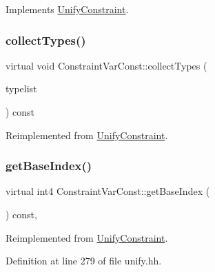 Implements \mbox{\hyperlink{class_unify_constraint_a4f068343932637d355644bb21559aa12}{Unify\+Constraint}}.

\mbox{\label{class_constraint_var_const_afd6f18a2472dfb5dd484b03505a4ebd6}} 
\subsubsection{\texorpdfstring{collectTypes()}{collectTypes()}}
{\footnotesize\ttfamily virtual void Constraint\+Var\+Const\+::collect\+Types (\begin{DoxyParamCaption}\item[{vector$<$ \mbox{\hyperlink{class_unify_datatype}{Unify\+Datatype}} $>$ \&}]{typelist }\end{DoxyParamCaption}) const\hspace{0.3cm}{\ttfamily [virtual]}}



Reimplemented from \mbox{\hyperlink{class_unify_constraint_acb83b6bea3b21e13054e72ac9cfaba0f}{Unify\+Constraint}}.

\mbox{\label{class_constraint_var_const_a8441e950b8d30d061a00db75c03c5e35}} 
\subsubsection{\texorpdfstring{getBaseIndex()}{getBaseIndex()}}
{\footnotesize\ttfamily virtual int4 Constraint\+Var\+Const\+::get\+Base\+Index (\begin{DoxyParamCaption}\item[{void}]{ }\end{DoxyParamCaption}) const\hspace{0.3cm}{\ttfamily [inline]}, {\ttfamily [virtual]}}



Reimplemented from \mbox{\hyperlink{class_unify_constraint_a44f0164f38ac1fdc44fc73ebe7678de1}{Unify\+Constraint}}.



Definition at line 279 of file unify.\+hh.

\mbox{\label{class_constraint_var_const_a4408cf7f3c133b79f24ba36285069c4a}} 

